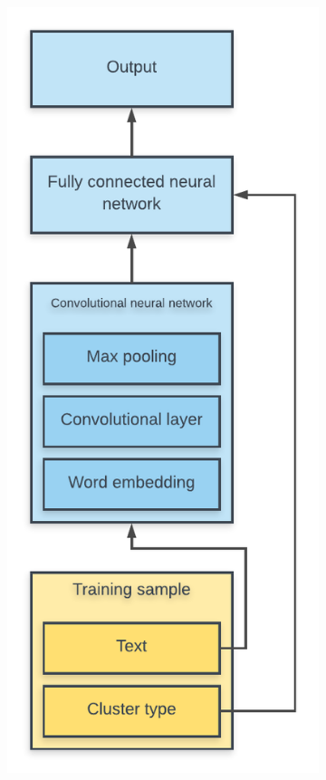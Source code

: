 \begin{figure}[p]
  \centering
  \begin{subfigure}[b]{0.45\textwidth}
    \includegraphics[width=\textwidth]{figures/nn_layout.pdf}

\end{subfigure}
\end{figure}

